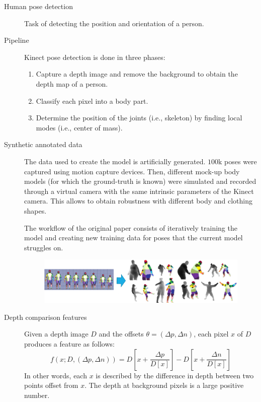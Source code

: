 \begin{description}
    \item[Human pose detection] 
        Task of detecting the position and orientation of a person.

    \item[Pipeline]
        Kinect pose detection is done in three phases:
        \begin{enumerate}
            \item Capture a depth image and remove the background to obtain the depth map of a person.
            \item Classify each pixel into a body part.
            \item Determine the position of the joints (i.e., skeleton) by finding local modes (i.e., center of mass).
        \end{enumerate}

    \item[Synthetic annotated data] 
        The data used to create the model is artificially generated. $100$k poses were captured using motion capture devices. Then, different mock-up body models (for which the ground-truth is known) were simulated and recorded through a virtual camera with the same intrinsic parameters of the Kinect camera. This allows to obtain robustness with different body and clothing shapes.

        \begin{remark}
            The workflow of the original paper consists of iteratively training the model and creating new training data for poses that the current model struggles on.
        \end{remark}

        \begin{figure}[H]
            \centering
            \includegraphics[width=0.75\linewidth]{./img/motion_data.png}
        \end{figure}

    \item[Depth comparison features] 
        Given a depth image $D$ and the offsets $\theta = (\Delta p, \Delta n)$, each pixel $x$ of $D$ produces a feature as follows:
        \[ f(x; D, (\Delta p, \Delta n)) = D\left[ x + \frac{\Delta p}{D[x]} \right] - D\left[ x + \frac{\Delta n}{D[x]} \right] \]
        In other words, each $x$ is described by the difference in depth between two points offset from $x$. The depth at background pixels is a large positive number.


\end{description}
